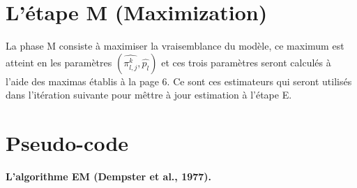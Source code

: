 \documentclass[frenchb]{report}
\newcommand{\1}{\mathbbm{1}}
\theoremstyle{definition}\newtheorem{defn}{Définition}
\theoremstyle{definition}\newtheorem{exm}{Exemple}
\theoremstyle{definition}\newtheorem{nota}{Notation}
\theoremstyle{definition}\newtheorem{rem}{Remarque}
\begin{document}
\section{L'étape M (Maximization)}

La phase M consiste à maximiser la vraisemblance du modèle, ce maximum est atteint en les paramètres $\left(\widehat{\pi^k_{l,j}}, \widehat{p_l} \right)$ et ces trois paramètres seront calculés à l'aide des maximas établis à la page $6$. Ce sont ces estimateurs qui seront utilisés dans l'itération suivante pour mêttre à jour estimation à l'étape E.

\section{Pseudo-code}

\begin{algorithm}
	\caption{\textbf{L’algorithme EM (Dempster et al., 1977).}}
	\begin{algorithmic}[1]
		\ENDFOR
	\end{algorithmic}
\end{algorithm}
\end{document}
